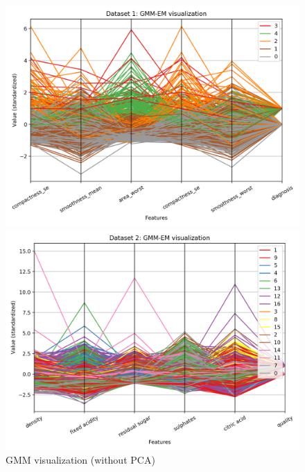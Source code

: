 \documentclass[letterpaper]{article}
\begin{document}
	\begin{figure}
		\centering
		\begin{minipage}{.5\textwidth}
			\centering
			\includegraphics[width=\linewidth]{../../plots/gmm_viz_1}
		\end{minipage}%
		\begin{minipage}{.5\textwidth}
			\centering
			\includegraphics[width=\linewidth]{../../plots/gmm_viz_2}
		\end{minipage}
		\caption{GMM visualization (without PCA)}
		\label{fig:gmm_viz}
	\end{figure}	
\end{document}
